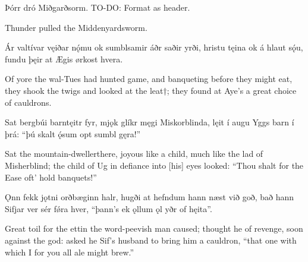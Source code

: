 Þórr dró Miðgarðsorm. TO-DO: Format as header.

Thunder pulled the Middenyardsworm.\footnotemark[1]

Ár valtívar \hld vęiðar nǫ́mu
ok sumblsamir \hld áðr saðir yrði,
hristu tęina \hld ok á hlaut sǫ́u,
fundu þęir at Ægis \hld ørkost hvera.

Of yore the wal-Tues had hunted game\footnotemark[1], and banqueting before they might eat\footnotemark[2], they shook the twigs and looked at the leat†\footnotemark[3]; they found at Aye’s a great choice of cauldrons.\footnotemark[4]

Sat bergbúi \hld barntęitr fyr,
mjǫk glíkr męgi \hld Miskorblinda,
lęit í augu \hld Yggs barn í þrá:
“þú skalt ǫ́sum \hld opt sumbl gęra!”

Sat the mountain-dweller\footnotemark[1] there, joyous like a child, much like the lad of Misherblind\footnotemark[2]; the child of Ug in defiance into [his] eyes looked: “Thou shalt for the Ease oft’ hold banquets!”\footnotemark[3]

Ǫnn fekk jǫtni \hld orðbæginn halr,
hugði at hefndum \hld hann næst við goð,
bað hann Sifjar ver \hld sér fǿra hver,
“þann’s ek ǫllum ǫl \hld yðr of hęita”.

Great toil for the ettin the word-peevish man caused; thought he of revenge, soon against the god: asked he Sif’s husband to bring him a cauldron, “that one with which I for you all ale might brew.”\footnotemark[1]

